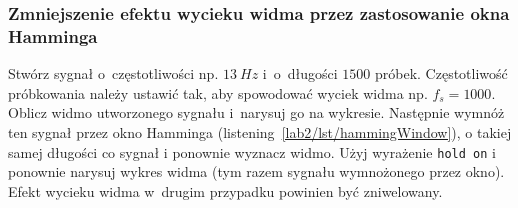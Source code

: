 \subsubsection{Zmniejszenie efektu wycieku widma przez zastosowanie okna Hamminga}
Stwórz sygnał o~częstotliwości np. $13~Hz$ i~o~długości $1500$ próbek. Częstotliwość próbkowania należy ustawić tak, aby spowodować wyciek widma np. $f_s = 1000$. Oblicz widmo utworzonego sygnału i~narysuj go na wykresie. Następnie wymnóż ten sygnał przez okno Hamminga (listening~\ref{lab2/lst/hammingWindow}), o takiej samej długości co sygnał i ponownie wyznacz widmo. Użyj wyrażenie \texttt{hold on} i ponownie narysuj wykres widma (tym razem sygnału wymnożonego przez okno). Efekt wycieku widma w~drugim przypadku powinien być zniwelowany. 

\newpage